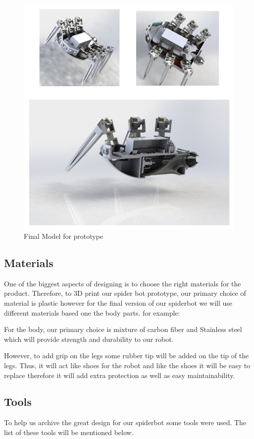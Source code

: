 \documentclass[10pt,journal,compsoc]{IEEEtran}
\begin{document}
\begin{figure}[h]
\includegraphics[scale=0.49]{finalmodel}
\caption{Final Model for prototype}
\label{fig:finalmodel}
\end{figure}

\subsection{Materials}

One of the biggest aspects of designing is to choose the right materials for the product. Therefore, to 3D print our spider bot prototype, our primary choice of material is plastic however for the final version of our spiderbot we will use different materials based one the body parts. for example:

For the body, our primary choice is mixture of carbon fiber and Stainless steel which will provide strength and durability to our robot.

However, to add grip on the legs some rubber tip will be added on the tip of the legs. Thus, it will act like shoes for the robot and like the shoes it will be easy to replace therefore it will add extra protection as well as easy maintainability.

\subsection{Tools}
To help us archive the great design for our spiderbot some tools were used.
The list of these tools will be mentioned below.
\end{document}
